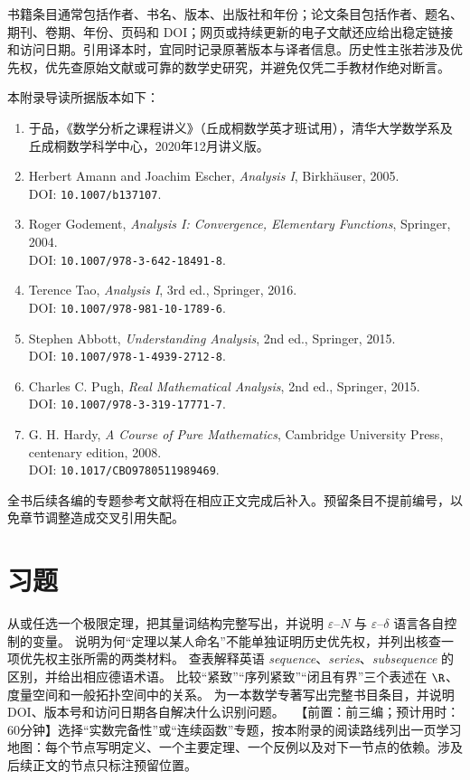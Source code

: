 书籍条目通常包括作者、书名、版本、出版社和年份；论文条目包括作者、题名、期刊、卷期、年份、页码和 DOI；网页或持续更新的电子文献还应给出稳定链接和访问日期。引用译本时，宜同时记录原著版本与译者信息。历史性主张若涉及优先权，优先查原始文献或可靠的数学史研究，并避免仅凭二手教材作绝对断言。

本附录导读所据版本如下：
\begin{enumerate}
 \item 于品，《数学分析之课程讲义》（丘成桐数学英才班试用），清华大学数学系及丘成桐数学科学中心，2020年12月讲义版。
 \item Herbert Amann and Joachim Escher, \emph{Analysis I}, Birkh\"auser, 2005.\\
 DOI: \nolinkurl{10.1007/b137107}.
 \item Roger Godement, \emph{Analysis I: Convergence, Elementary Functions}, Springer, 2004.\\
 DOI: \nolinkurl{10.1007/978-3-642-18491-8}.
 \item Terence Tao, \emph{Analysis I}, 3rd ed., Springer, 2016.\\
 DOI: \nolinkurl{10.1007/978-981-10-1789-6}.
 \item Stephen Abbott, \emph{Understanding Analysis}, 2nd ed., Springer, 2015.\\
 DOI: \nolinkurl{10.1007/978-1-4939-2712-8}.
 \item Charles C. Pugh, \emph{Real Mathematical Analysis}, 2nd ed., Springer, 2015.\\
 DOI: \nolinkurl{10.1007/978-3-319-17771-7}.
 \item G. H. Hardy, \emph{A Course of Pure Mathematics}, Cambridge University Press, centenary edition, 2008.\\
 DOI: \nolinkurl{10.1017/CBO9780511989469}.
\end{enumerate}

全书后续各编的专题参考文献将在相应正文完成后补入。预留条目不提前编号，以免章节调整造成交叉引用失配。

\section*{习题}

\begin{enumerate}[label=\textbf{G.\arabic*.}]
  从或任选一个极限定理，把其量词结构完整写出，并说明 $\varepsilon$--$N$ 与 $\varepsilon$--$\delta$ 语言各自控制的变量。
  说明为何“定理以某人命名”不能单独证明历史优先权，并列出核查一项优先权主张所需的两类材料。
  查表解释英语 \emph{sequence}、\emph{series}、\emph{subsequence} 的区别，并给出相应德语术语。
  比较“紧致”“序列紧致”“闭且有界”三个表述在 $\R$、度量空间和一般拓扑空间中的关系。
  为一本数学专著写出完整书目条目，并说明 DOI、版本号和访问日期各自解决什么识别问题。
  \ 【前置：前三编；预计用时：60分钟】选择“实数完备性”或“连续函数”专题，按本附录的阅读路线列出一页学习地图：每个节点写明定义、一个主要定理、一个反例以及对下一节点的依赖。涉及后续正文的节点只标注预留位置。
\end{enumerate}

